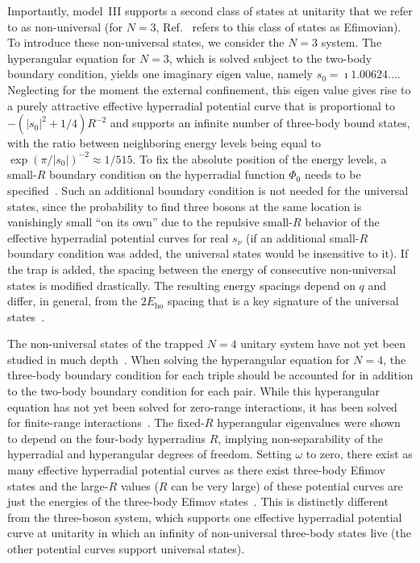 \documentclass[aps,pra,twocolumn,showpacs,superscriptaddress]{revtex4}
\begin{document}
Importantly, model~III
supports a second class of states at unitarity
that we refer to as non-universal
(for $N=3$, Ref.~\cite{wernerPRL2006} 
refers to this class of states as 
Efimovian).
To introduce these non-universal states, we consider the $N=3$ system.
The hyperangular equation for $N=3$, which is solved subject to the
two-body boundary condition, yields one imaginary
eigen value, namely $s_0 = \imath 1.00624\dots$.
Neglecting for the moment
the external confinement, this eigen value gives rise to a
purely attractive effective hyperradial
potential curve that is proportional to
$-(|s_0|^2+1/4)R^{-2}$ and supports an infinite number of three-body
bound states,
with the ratio between neighboring energy levels being 
equal to $\exp(\pi/|s_0|)^{-2}\approx 1/515$.
To fix the absolute position of the energy levels, a small-$R$
boundary condition on the 
hyperradial function $\Phi_0$ needs to be 
specified~\cite{efimov70,braaten2006,naidon2017}.
Such an additional boundary condition is not needed 
for the universal states, since
the probability to find three bosons at the same location is vanishingly 
small ``on its own'' due to the repulsive small-$R$ behavior of the effective
hyperradial potential curves
for real $s_{\nu}$ (if an additional small-$R$
boundary condition was added, the universal states
would be insensitive to it).
If the trap is added, the spacing between the energy of
consecutive non-universal states is modified drastically. 
The resulting energy spacings 
depend on $q$ and differ, in general,
from the $2 E_{\text{ho}}$ spacing that is
a key signature of
the universal 
states~\cite{jonsell2002,wernerPRL2006}.

The non-universal states of the trapped $N=4$ unitary system
have not yet been studied in much depth~\cite{toelle2011,toelle2013}.
When solving the hyperangular equation for $N=4$,
the three-body boundary condition for each triple should be accounted
for in addition
to the two-body boundary condition for each pair.
While this hyperangular equation has not yet been solved for
zero-range interactions,
it has been solved for finite-range interactions~\cite{vonstecher2009}.
The fixed-$R$ hyperangular eigenvalues were shown to depend on
the four-body hyperradius $R$, implying non-separability
of the hyperradial and hyperangular degrees of freedom.
Setting $\omega$ to zero,
there exist as many 
effective hyperradial potential curves as there exist 
three-body Efimov states and the large-$R$ values 
($R$ can be very large) of these potential curves
are just the 
energies of the three-body 
Efimov states~\cite{vonstecher2009}.
This is distinctly different from the three-boson system, which
supports one effective hyperradial potential 
curve at unitarity in which an infinity of
non-universal three-body states live
(the other potential curves support universal states).
\end{document}

